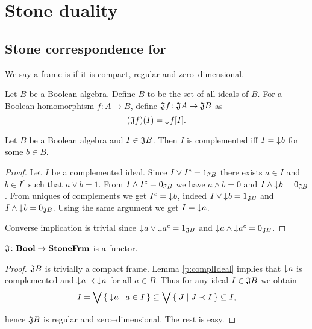 \chapter{Stone duality}
\section{Stone correspondence for \StoneFrm}

\begin{definition}
    We say a frame is  if it is compact, regular and zero--dimensional.
\end{definition}

\begin{definition}
    Let $B$ be a Boolean algebra. Define $B$ to be the set of all ideals of $B$.
    For a Boolean homomorphism $f\colon A \to B$, define $\mathfrak{J} f\colon \mathfrak{J} A \to \mathfrak{J} B$ as
    $$(\mathfrak{J} f)(I) = \mathord{\downarrow}\mkern1mu f[I].$$
\end{definition}

\begin{lemma}\label{p:complIdeal}
    Let $B$ be a Boolean algebra and $I \in \mathfrak{J} B$. Then $I$ is complemented iff $I = \mathord{\downarrow}\mkern1mu b$ for some $b \in B$.
\end{lemma}
\begin{proof}
    Let $I$ be a complemented ideal. Since $I \vee I^c = 1_{\mathfrak{J} B}$ there exists $a \in I$ and $b \in I^c$ such that $a \vee b = 1$. From $I \wedge I^c = 0_{\mathfrak{J} B}$ we have $a \wedge b = 0$ and $I \wedge \mathord{\downarrow}\mkern1mu b = 0_{\mathfrak{J} B}$.
    From uniques of complements we get $I^c = \mathord{\downarrow}\mkern1mu b$, indeed $I \vee \mathord{\downarrow}\mkern1mu b = 1_{\mathfrak{J} B}$ and $I \wedge \mathord{\downarrow}\mkern1mu b = 0_{\mathfrak{J} B}$. Using the same argument we get $I = \mathord{\downarrow}\mkern1mu a$.

    Converse implication is trivial since $\mathord{\downarrow}\mkern1mu a \vee \mathord{\downarrow}\mkern1mu a^c = 1_{\mathfrak{J} B}$ and $\mathord{\downarrow}\mkern1mu a \wedge \mathord{\downarrow}\mkern1mu a^c = 0_{\mathfrak{J} B}$.
\end{proof}

\begin{proposition}\label{p:JisFunctor}
    $\mathfrak{J}\colon \mathbf{Bool} \to \mathbf{StoneFrm}$ is a functor.
\end{proposition}
\begin{proof}
    $\mathfrak{J} B$ is trivially a compact frame. Lemma \ref{p:complIdeal} implies that $\mathord{\downarrow}\mkern1mu a$ is complemented and $\mathord{\downarrow}\mkern1mu a \prec \mathord{\downarrow}\mkern1mu a$ for all $a \in B$. Thus for any ideal $I \in \mathfrak{J} B$ we obtain
    $$ I = \bigvee \Set{ \mathord{\downarrow}\mkern1mua | a \in I } \subseteq \bigvee \Set{ J | J \prec I } \subseteq I,$$

\noindent hence $\mathfrak{J} B$ is regular and zero--dimensional. The rest is easy.
\end{proof}

